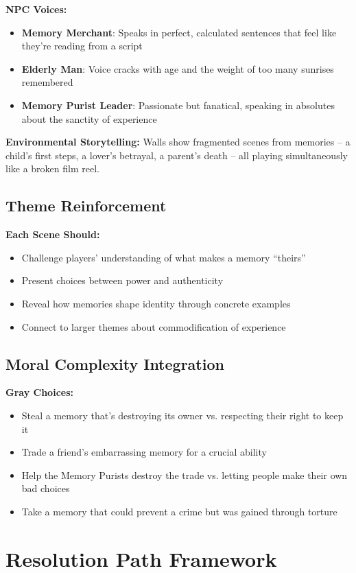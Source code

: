\documentclass[11pt]{article}
\begin{document}
\textbf{NPC Voices:}
\begin{itemize}[leftmargin=*]
  \item \textbf{Memory Merchant}: Speaks in perfect, calculated sentences that feel like they're reading from a script
  \item \textbf{Elderly Man}: Voice cracks with age and the weight of too many sunrises remembered
  \item \textbf{Memory Purist Leader}: Passionate but fanatical, speaking in absolutes about the sanctity of experience
\end{itemize}

\textbf{Environmental Storytelling:} Walls show fragmented scenes from memories -- a child's first steps, a lover's betrayal, a parent's death -- all playing simultaneously like a broken film reel.

\subsection*{Theme Reinforcement}
\textbf{Each Scene Should:}
\begin{itemize}[leftmargin=*]
  \item Challenge players' understanding of what makes a memory ``theirs''
  \item Present choices between power and authenticity
  \item Reveal how memories shape identity through concrete examples
  \item Connect to larger themes about commodification of experience
\end{itemize}

\subsection*{Moral Complexity Integration}
\textbf{Gray Choices:}
\begin{itemize}[leftmargin=*]
  \item Steal a memory that's destroying its owner vs. respecting their right to keep it
  \item Trade a friend's embarrassing memory for a crucial ability
  \item Help the Memory Purists destroy the trade vs. letting people make their own bad choices
  \item Take a memory that could prevent a crime but was gained through torture
\end{itemize}

\section*{Resolution Path Framework}
\end{document}

